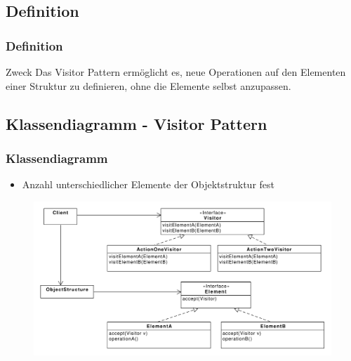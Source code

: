 \subsection{Definition}
\begin{frame}
  \frametitle{Definition}
  \begin{block}{Zweck}
Das Visitor Pattern ermöglicht es, neue Operationen auf den Elementen einer Struktur zu definieren, ohne die Elemente selbst anzupassen.
  \end{block}
\end{frame}

\subsection{Klassendiagramm - Visitor Pattern}
\begin{frame}
	\frametitle{Klassendiagramm}		
	\begin{itemize}
		\item Anzahl unterschiedlicher Elemente der Objektstruktur fest
	\end{itemize}	
  	\begin{figure}
		\includegraphics[scale=.3]{paper/visitor/visitor}
	\end{figure}
\end{frame}

